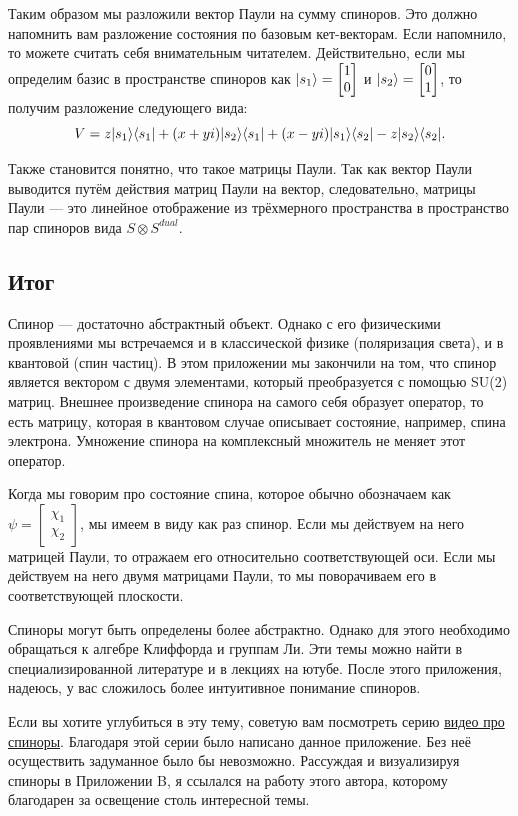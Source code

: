 Таким образом мы разложили вектор Паули на сумму спиноров. Это должно напомнить
вам разложение состояния по базовым кет-векторам. Если напомнило, то можете
считать себя внимательным читателем. Действительно, если мы определим базис в
пространстве спиноров как $\lvert s_1\rangle = \begin{bmatrix} 1 \\ 0 \end{bmatrix}$ и $\lvert s_2\rangle = \begin{bmatrix} 0 \\ 1 \end{bmatrix}$, то получим разложение следующего вида:
\[
  V = z \lvert s_1\rangle\langle s_1\rvert + (x + yi)\lvert s_2\rangle\langle s_1\rvert + (x-yi)\lvert s_1\rangle\langle s_2\rvert - z \lvert s_2\rangle\langle s_2\rvert.
\]

Также становится понятно, что такое матрицы Паули. Так как вектор Паули
выводится путём действия матриц Паули на вектор, следовательно, матрицы Паули
--- это линейное отображение из трёхмерного пространства в пространство пар
спиноров вида $S \otimes S^{dual}$.
\subsection{Итог}

Спинор --- достаточно абстрактный объект. Однако с его физическими проявлениями
мы встречаемся и в классической физике (поляризация света), и в квантовой (спин
частиц). В этом приложении мы закончили на том, что спинор является вектором с
двумя элементами, который преобразуется с помощью SU(2) матриц. Внешнее
произведение спинора на самого себя образует оператор, то есть матрицу, которая
в квантовом случае описывает состояние, например, спина электрона. Умножение
спинора на комплексный множитель не меняет этот оператор.

Когда мы говорим про состояние спина, которое обычно обозначаем как $\psi = \begin{bmatrix} \chi_1 \\ \chi_2 \end{bmatrix}$, мы имеем в виду как раз спинор. Если мы действуем на него матрицей Паули, то
отражаем его относительно соответствующей оси. Если мы действуем на него двумя
матрицами Паули, то мы поворачиваем его в соответствующей плоскости.

Спиноры могут быть определены более абстрактно. Однако для этого необходимо
обращаться к алгебре Клиффорда и группам Ли. Эти темы можно найти в
специализированной литературе и в лекциях на ютубе. После этого приложения,
надеюсь, у вас сложилось более интуитивное понимание спиноров.

Если вы хотите углубиться в эту тему, советую вам посмотреть серию
\href{https://www.youtube.com/watch?v=j5soqexrwqY&list=PLJHszsWbB6hoOo_wMb0b6T44KM_ABZtBs&ab_channel=eigenchris}{видео
  про спиноры}. Благодаря этой серии было написано данное приложение. Без неё
осуществить задуманное было бы невозможно. Рассуждая и визуализируя спиноры в
Приложении B, я ссылался на работу этого автора, которому благодарен за
освещение столь интересной темы.
